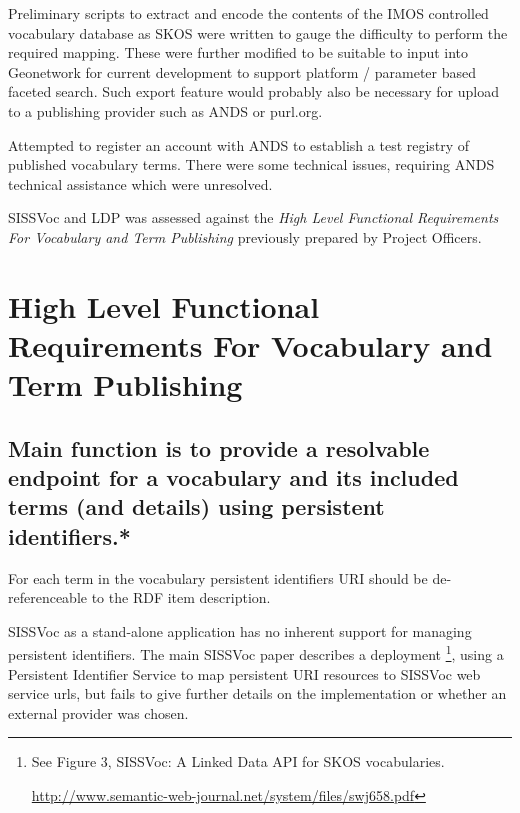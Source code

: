 \documentclass[10pt,a4paper]{article}
\begin{document}
\begin{flushleft}
    \item[] Preliminary scripts to extract and encode the contents of the IMOS
  controlled vocabulary database as SKOS were written to gauge the difficulty to
  perform the required mapping. These were further modified to be suitable to
  input into Geonetwork for current development to support platform / parameter
  based faceted search. Such export feature would probably also be necessary for
  upload to a publishing provider such as ANDS or purl.org. 

    \item[] Attempted to register an account with ANDS to establish a
  test registry of published vocabulary terms. There were some technical issues,
  requiring ANDS technical assistance which were unresolved.
      
    \item[] SISSVoc and LDP was assessed against the \textit{High Level Functional
  Requirements For Vocabulary and Term Publishing} previously prepared by Project
  Officers.
    

\clearpage


\section { 
	High Level Functional Requirements For Vocabulary and Term Publishing
}

  \subsection{
   Main function is to provide a resolvable endpoint for a vocabulary and its
  included terms (and details) using persistent identifiers.* 
  }

  \item For each term in the vocabulary persistent identifiers {URI} should
  be de-referenceable to the RDF item description. 

  \item SISSVoc as a stand-alone application has no inherent support for managing persistent
  identifiers. The main SISSVoc paper describes a deployment \footnote{ See Figure 3,
  SISSVoc: A Linked Data API for SKOS vocabularies.

  \url{http://www.semantic-web-journal.net/system/files/swj658.pdf} }, using a
  Persistent Identifier Service to map persistent URI resources to SISSVoc
  web service urls, but fails to give further details on the implementation or
  whether an external provider was chosen. 


\end{flushleft}
\end{document}
